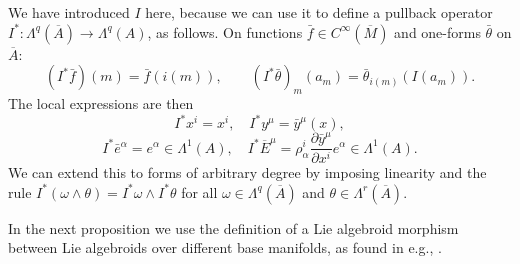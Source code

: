 \documentclass[11pt]{article}
\theoremstyle{plain}
\theoremstyle{definition}
\begin{document}
We have introduced $I$ here, because we can use it to define a pullback operator $I^{\ast}\colon \Lambda^q(\overline{A})\to \Lambda^q(A)$, as follows. On functions $\bar f\in C^{\infty}(\overline{M})$ and one-forms $\bar\theta$ on $\overline{A}$:
\begin{equation*}
    (I^{\ast}{\bar f})(m) = \bar f(i(m)),\qquad (I^{\ast}{\bar \theta})_m(a_m)= \bar\theta_{i(m)}(I(a_m)).
\end{equation*}
The local expressions are then
\begin{equation*}
    I^{\ast}x^i=x^i,\quad I^{\ast}y^{\mu}=\bar{y}^{\mu}(x),
\end{equation*}
\begin{equation*}
    I^{\ast}\bar{e}^{\alpha}=e^{\alpha}\in \Lambda^1(A),\quad I^{\ast} \overline{E}^{\mu}=\rho_{\alpha}^i\frac{\partial \bar{y}^{\mu}}{\partial x^i}e^{\alpha}\in \Lambda^1(A).
\end{equation*}
We can extend this to forms of arbitrary degree by imposing linearity and the rule $I^{\ast}(\omega\wedge \theta)=I^{\ast}\omega\wedge I^{\ast}\theta$ for all $\omega\in \Lambda^q(\overline{A})$ and $\theta\in \Lambda^r(\overline{A})$.



In the next proposition we use the definition of a Lie algebroid morphism between Lie algebroids over different base manifolds, as found in e.g., \cite{barbero2016invproblemliealgebroids,deleon2005survey}.
\end{document}
